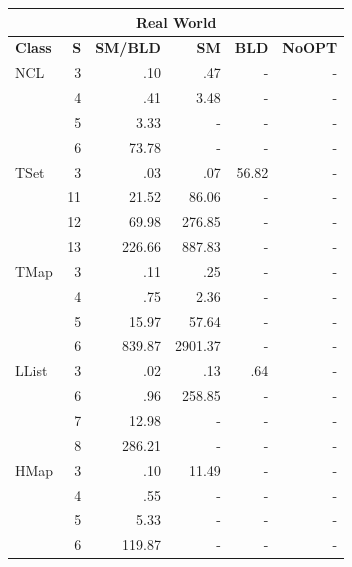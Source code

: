 \begin{table}[!thb]
\scriptsize

\centering
\begin{tabular}{ l r | r | r | r | r  }
  \toprule
  \multicolumn{6}{c}{\textbf{Real World}} \\
  \midrule 
  \textbf{Class} & \textbf{S} & \textbf{SM/BLD} & \textbf{SM}  & \textbf{BLD} & \textbf{NoOPT}  \\
  \midrule
  NCL
  & 3 & .10 & .47 & -  & -  \\
  & 4 & .41 & 3.48  &  - & -  \\
  & 5 & 3.33  &  - &  - & -  \\
  & 6 & 73.78 &  - &  - &  - \\
  \midrule
  TSet
  & 3 & .03 & .07 & 56.82 & - \\
  & 11  & 21.52 & 86.06 &  - & -  \\
  & 12  & 69.98 & 276.85  &  - & -  \\
  & 13  & 226.66  & 887.83  &  - & -  \\
    \midrule
  TMap
  & 3 & .11 & .25 & - & - \\
  & 4 & .75 & 2.36  &  - &  - \\
  & 5 & 15.97 & 57.64 &  - & -  \\
  & 6 & 839.87  & 2901.37 &  - &  - \\
  \midrule
  LList
  & 3 & .02 & .13 & .64 & - \\
  & 6 & .96 & 258.85  & -  &  - \\
  & 7 & 12.98 &  - &  - &  - \\
  & 8 & 286.21  & -  & -  & -  \\
  \midrule
  HMap
  & 3 & .10 & 11.49 & - & - \\
  & 4 & .55 & -  & -  & -  \\
  & 5 & 5.33  & -  &  - &  - \\
  & 6 & 119.87  &  - &  - &  - \\
  \bottomrule

\end{tabular}

\label{table:beapi}

\end{table}

